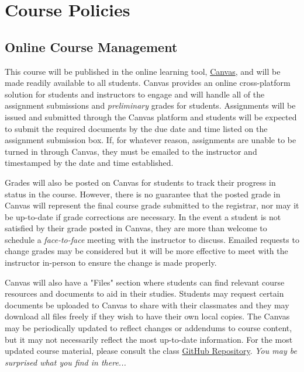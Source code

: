 \section*{Course Policies} 

    \subsection*{Online Course Management}

    This course will be published in the online learning tool, \href{instructure.fit.edu}{Canvas}, and will be made readily available to all students. 
    Canvas provides an online cross-platform solution for students and instructors to engage and will handle all of the assignment submissions and \emph{preliminary} grades for students.
    Assignments will be issued and submitted through the Canvas platform and students will be expected to submit the required documents by the due date and time listed on the assignment submission box.
    If, for whatever reason, assignments are unable to be turned in through Canvas, they must be emailed to the instructor and timestamped by the date and time established.
    
    Grades will also be posted on Canvas for students to track their progress in status in the course.
    However, there is no guarantee that the posted grade in Canvas will represent the final course grade submitted to the registrar, nor may it be up-to-date if grade corrections are necessary.
    In the event a student is not satisfied by their grade posted in Canvas, they are more than welcome to schedule a \emph{face-to-face} meeting with the instructor to discuss.
    Emailed requests to change grades may be considered but it will be more effective to meet with the instructor in-person to ensure the change is made properly.

    Canvas will also have a "Files" section where students can find relevant course resources and documents to aid in their studies.
    Students may request certain documents be uploaded to Canvas to share with their classmates and they may download all files freely if they wish to have their own local copies.
    The Canvas may be periodically updated to reflect changes or addendums to course content, but it may not necessarily reflect the most up-to-date information.
    For the most updated course material, please consult the class \href{https://github.com/OCE4531-Materials}{GitHub Repository}. \emph{You may be surprised what you find in there...}

